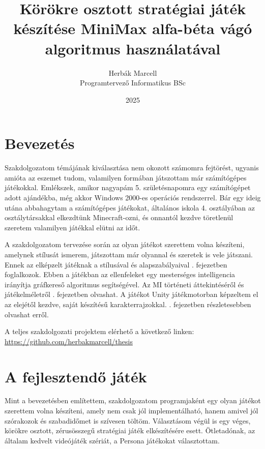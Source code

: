 \documentclass[
]{thesis-ekf}
\theoremstyle{definition}
\theoremstyle{remark}
\begin{document}
\title{Körökre osztott stratégiai játék készítése MiniMax alfa-béta vágó algoritmus használatával}
\author{Herbák Marcell\\Programtervező Informatikus BSc}
\date{2025}
\maketitle

\tableofcontents

\chapter{Bevezetés}

Szakdolgozatom témájának kiválasztása nem okozott számomra fejtörést, ugyanis amióta az eszemet tudom, valamilyen formában játszottam már számítógépes játékokkal. Emlékszek, amikor nagyapám 5. születésnapomra egy számítógépet adott ajándékba, még akkor Windows 2000-es operációs rendszerrel. Bár egy ideig utána abbahagytam a számítógépes játékokat, általános iskola 4. osztályában az osztálytársakkal elkezdtünk Minecraft-ozni, és onnantól kezdve töretlenül szeretem valamilyen játékkal elütni az időt. 

A szakdolgozatom tervezése során az olyan játékot szerettem volna készíteni, amelynek stílusát ismerem, játszottam már olyannal és szeretek is vele játszani. Ennek az elképzelt játéknak a stílusával és alapszabályaival . fejezetben foglalkozok. Ebben a játékban az ellenfeleket egy mesterséges intelligencia irányítja gráfkereső algoritmus segítségével. Az MI történeti áttekintéséről és játékelméletről . fejezetben olvashat. A játékot Unity játékmotorban képzeltem el az elejétől kezdve, saját készítésű karakterrajzokkal. . fejezetben részletesebben olvashat erről.

A teljes szakdolgozati projektem elérhető a következő linken: \url{https://github.com/herbakmarcell/thesis}

\chapter{A fejlesztendő játék} \label{dev-game}

Mint a bevezetésben említettem, szakdolgozatom programjaként egy olyan játékot szerettem volna készíteni, amely nem csak jól implementálható, hanem amivel jól szórakozok és szabadidőmet is szívesen töltöm. Választásom végül is egy véges, körökre osztott, zérusösszegű stratégiai játék elkészítésére esett. Ötletadónak, az általam kedvelt videójáték szériát, a Persona játékokat választottam. \cite{Persona}
\end{document}
